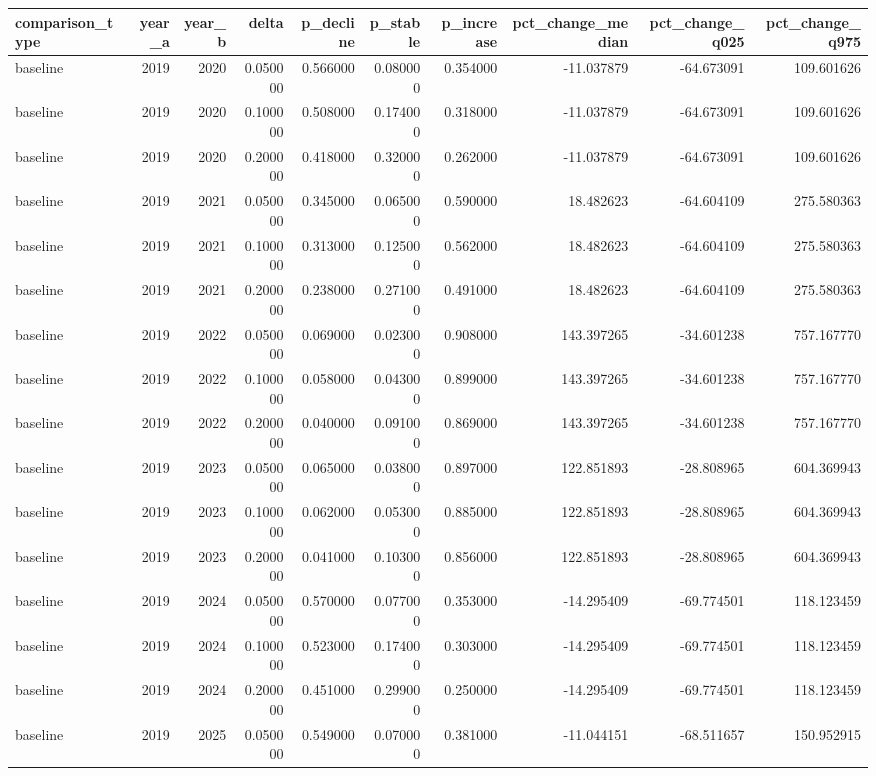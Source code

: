 \begin{tabular}{lrrrrrrrrr}
\toprule
comparison\_type & year\_a & year\_b & delta & p\_decline & p\_stable & p\_increase & pct\_change\_median & pct\_change\_q025 & pct\_change\_q975 \\
\midrule
baseline & 2019 & 2020 & 0.050000 & 0.566000 & 0.080000 & 0.354000 & -11.037879 & -64.673091 & 109.601626 \\
baseline & 2019 & 2020 & 0.100000 & 0.508000 & 0.174000 & 0.318000 & -11.037879 & -64.673091 & 109.601626 \\
baseline & 2019 & 2020 & 0.200000 & 0.418000 & 0.320000 & 0.262000 & -11.037879 & -64.673091 & 109.601626 \\
baseline & 2019 & 2021 & 0.050000 & 0.345000 & 0.065000 & 0.590000 & 18.482623 & -64.604109 & 275.580363 \\
baseline & 2019 & 2021 & 0.100000 & 0.313000 & 0.125000 & 0.562000 & 18.482623 & -64.604109 & 275.580363 \\
baseline & 2019 & 2021 & 0.200000 & 0.238000 & 0.271000 & 0.491000 & 18.482623 & -64.604109 & 275.580363 \\
baseline & 2019 & 2022 & 0.050000 & 0.069000 & 0.023000 & 0.908000 & 143.397265 & -34.601238 & 757.167770 \\
baseline & 2019 & 2022 & 0.100000 & 0.058000 & 0.043000 & 0.899000 & 143.397265 & -34.601238 & 757.167770 \\
baseline & 2019 & 2022 & 0.200000 & 0.040000 & 0.091000 & 0.869000 & 143.397265 & -34.601238 & 757.167770 \\
baseline & 2019 & 2023 & 0.050000 & 0.065000 & 0.038000 & 0.897000 & 122.851893 & -28.808965 & 604.369943 \\
baseline & 2019 & 2023 & 0.100000 & 0.062000 & 0.053000 & 0.885000 & 122.851893 & -28.808965 & 604.369943 \\
baseline & 2019 & 2023 & 0.200000 & 0.041000 & 0.103000 & 0.856000 & 122.851893 & -28.808965 & 604.369943 \\
baseline & 2019 & 2024 & 0.050000 & 0.570000 & 0.077000 & 0.353000 & -14.295409 & -69.774501 & 118.123459 \\
baseline & 2019 & 2024 & 0.100000 & 0.523000 & 0.174000 & 0.303000 & -14.295409 & -69.774501 & 118.123459 \\
baseline & 2019 & 2024 & 0.200000 & 0.451000 & 0.299000 & 0.250000 & -14.295409 & -69.774501 & 118.123459 \\
baseline & 2019 & 2025 & 0.050000 & 0.549000 & 0.070000 & 0.381000 & -11.044151 & -68.511657 & 150.952915 \\

\end{tabular}
